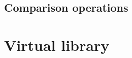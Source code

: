 \documentclass[11pt]{article}
\begin{document}
    \subsection{Comparison operations}
    \label{seccomp}
    

%
%    
%
%    
%
%    

\section{Virtual library}
\label{seclibrary}

\end{document}
